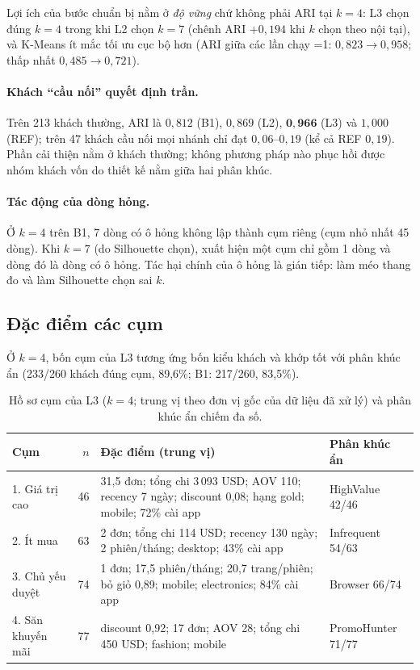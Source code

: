 Lợi ích của bước chuẩn bị nằm ở \emph{độ vững} chứ không phải ARI tại $k=4$: L3 chọn đúng $k=4$ trong khi L2 chọn $k=7$ (chênh ARI $+0{,}194$ khi $k$ chọn theo nội tại), và K-Means ít mắc tối ưu cục bộ hơn
(ARI giữa các lần chạy =1: $0{,}823\to0{,}958$; thấp nhất $0{,}485\to0{,}721$).

\paragraph{Khách ``cầu nối'' quyết định trần.} Trên 213 khách thường, ARI là $0{,}812$ (B1), $0{,}869$ (L2), $\mathbf{0{,}966}$ (L3) và $1{,}000$ (REF); trên 47 khách cầu nối mọi nhánh chỉ đạt $0{,}06$--$0{,}19$ (kể cả REF $0{,}19$).
Phần cải thiện nằm ở khách thường; không phương pháp nào phục hồi được nhóm khách vốn do thiết kế nằm giữa hai phân khúc.

\paragraph{Tác động của dòng hỏng.} Ở $k=4$ trên B1, 7 dòng có ô hỏng không lập thành cụm riêng (cụm nhỏ nhất 45 dòng). Khi $k=7$ (do Silhouette chọn), xuất hiện một cụm chỉ gồm 1 dòng và dòng đó là dòng có ô hỏng. Tác hại chính của ô hỏng là gián tiếp:
làm méo thang đo và làm Silhouette chọn sai $k$.

\subsection{Đặc điểm các cụm}
Ở $k=4$, bốn cụm của L3 tương ứng bốn kiểu khách và khớp tốt với phân khúc ẩn (233/260 khách đúng cụm, 89,6\%; B1: 217/260, 83,5\%).

\begin{table}[htbp]
\centering\small
\caption{Hồ sơ cụm của L3 ($k=4$; trung vị theo đơn vị gốc của dữ liệu đã xử lý) và phân khúc ẩn chiếm đa số.}
\label{tab:e_prof}
\begin{tabularx}{\linewidth}{lrX l}
\toprule
Cụm & $n$ & Đặc điểm (trung vị) & Phân khúc ẩn\\
\midrule
1. Giá trị cao & 46 & 31,5 đơn; tổng chi 3\,093 USD; AOV 110; recency 7 ngày; discount 0,08; hạng gold; mobile; 72\% cài app & HighValue 42/46\\
2. Ít mua & 63 & 2 đơn; tổng chi 114 USD; recency 130 ngày; 2 phiên/tháng; desktop; 43\% cài app & Infrequent 54/63\\
3. Chủ yếu duyệt & 74 & 1 đơn; 17,5 phiên/tháng; 20,7 trang/phiên; bỏ giỏ 0,89; mobile; electronics; 84\% cài app & Browser 66/74\\
4. Săn khuyến mãi & 77 & discount 0,92; 17 đơn; AOV 28; tổng chi 450 USD; fashion; mobile & PromoHunter 71/77\\
\bottomrule
\end{tabularx}
\end{table}

